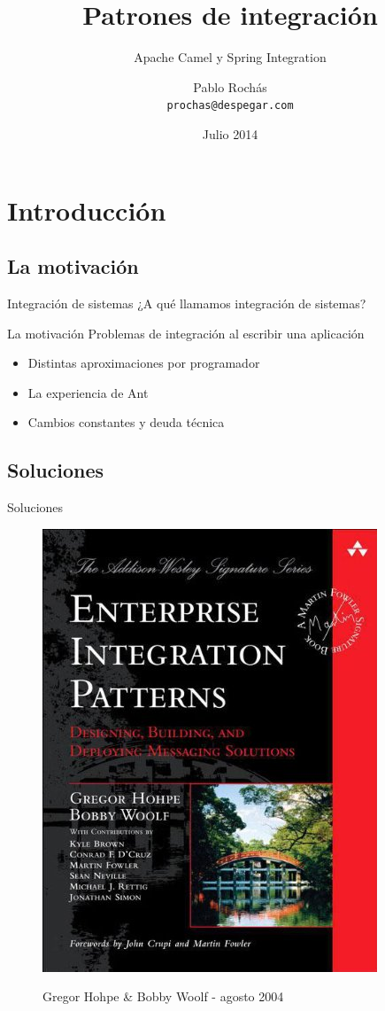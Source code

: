 \documentclass{beamer}
\title{Patrones de integración}
\subtitle{Apache Camel y Spring Integration}
\author[Despegar.com]{Pablo Rochás\\ \texttt{prochas@despegar.com}}
\date[Despegar]{Julio 2014}
\begin{document}
\begin{frame}
\titlepage
\end{frame}

\section{Introducción}
\subsection{La motivación}
\begin{frame}{Integración de sistemas}
¿A qué llamamos integración de sistemas?
\end{frame}

\begin{frame}{La motivación}
Problemas de integración al escribir una aplicación
\begin{itemize}[<+->]
\item Distintas aproximaciones por programador
\item La experiencia de Ant
\item Cambios constantes y deuda técnica
\end{itemize}
\end{frame}

\subsection{Soluciones}
\begin{frame}{Soluciones}
\begin{figure}
\begin{center}
\includegraphics[scale=0.35]{TAPA}

Gregor Hohpe \& Bobby Woolf - agosto 2004
\end{center}
\end{figure}
\end{frame}
\end{document}

